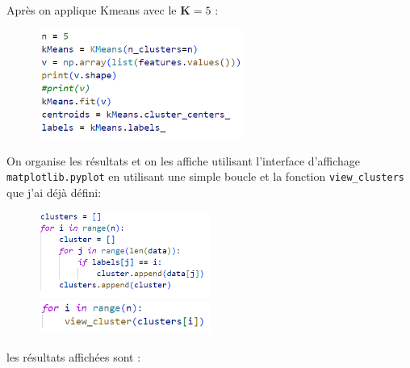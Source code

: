 \documentclass[a4paper,12pt]{report}
\begin{document}
Après on applique Kmeans avec le $\textbf{K} = 5$ :

\begin{figure}[ht]
    \includegraphics[width=0.6\textwidth]{kmeans.PNG}
\end{figure}

On organise les résultats et on les affiche utilisant l'interface d'affichage \texttt{matplotlib.pyplot}
en utilisant une simple boucle et la fonction \texttt{view\_clusters} que j'ai déjà défini:\newpage
\begin{figure}[ht]
    \includegraphics[width=0.5\textwidth]{results.PNG}
    \includegraphics[width=0.5\textwidth]{showres.PNG}
\end{figure}

les résultats affichées sont : 
\end{document}
